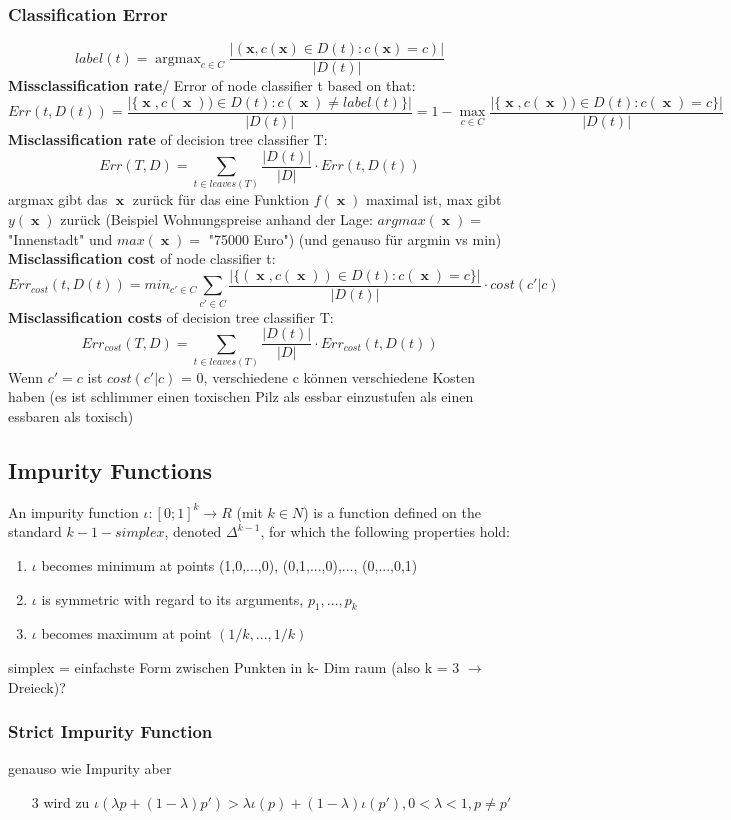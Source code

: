 \documentclass[11pt,a4paper]{article}
\DeclareMathOperator*{\argmax}{argmax}
\DeclareMathOperator*{\x}{\textbf{x}}
\begin{document}
\begin{flushleft}
\subsubsection{Classification Error}
$$ label(t) = \argmax_{c \in C} \dfrac{|(\textbf{x},c(\textbf{x}) \in D(t): c(\textbf{x}) = c)|}{|D(t)|} $$
\textbf{Missclassification rate}/ Error of node classifier t based on that:
$$ Err(t,D(t)) = \dfrac{|\{ \x , c( \x ) ) \in D (t) : c( \x ) \neq label(t) \} | }{|D(t)|} = 1 - \max_{c \in C} \dfrac{|\{ \x , c( \x ) ) \in D (t) : c( \x ) = c \} | }{|D(t)|} $$
\textbf{Misclassification rate} of decision tree classifier T: 
$$ Err(T,D) = \sum_{t \in leaves(T)} \frac{|D(t)|}{|D|} \cdot Err(t, D(t)) $$
argmax gibt das $\x $  zurück für das eine Funktion $f(\x )$ maximal ist, max gibt $ y (\x )$ zurück (Beispiel Wohnungspreise anhand der Lage: $argmax(\x ) =$  "Innenstadt" und $max(\x ) = $ "75000 Euro") (und genauso für argmin vs min) \\
\textbf{Misclassification cost} of node classifier t:
$$ Err_{cost}(t,D(t)) = min_{c' \in C} \sum_{c' \in C} \frac{|\{ (\x , c(\x )) \in D(t): c(\x )=c \}|}{|D(t)|} \cdot cost(c' | c) $$
\textbf{Misclassification costs} of decision tree classifier T:
$$ Err_{cost}(T,D) = \sum_{t \in leaves(T)} \frac{|D(t)|}{|D|} \cdot Err_{cost}(t, D(t)) $$
Wenn $c' = c$ ist $cost(c'|c)$ = 0, verschiedene c können verschiedene Kosten haben (es ist schlimmer einen toxischen Pilz als essbar einzustufen als einen essbaren als toxisch)

\subsection{Impurity Functions}
An impurity function $\iota : [0;1]^k \rightarrow R$ (mit $k \in N $) is a function defined on the standard
$k-1- simplex$, denoted $\Delta ^{k-1} $, for which the following properties hold:
\begin{enumerate}
\item $\iota $ becomes minimum at points (1,0,...,0), (0,1,...,0),..., (0,...,0,1)
\item $\iota $ is symmetric with regard to its arguments, $p_1, ... , p_k $
\item $\iota $ becomes maximum at point $(1/k, ..., 1/k)$
\end{enumerate}
simplex = einfachste Form zwischen Punkten in k- Dim raum (also k = 3 $\rightarrow$ Dreieck)? \\

\subsubsection{Strict Impurity Function} 
genauso wie Impurity aber 
\begin{itemize}
\item[3] wird zu $ \iota(\lambda p + (1 - \lambda ) p' ) > \lambda \iota (p) + ( 1 - \lambda ) \iota (p'), 0 < \lambda < 1, p \neq p'  $
\end{itemize}


\end{flushleft}
\end{document}
